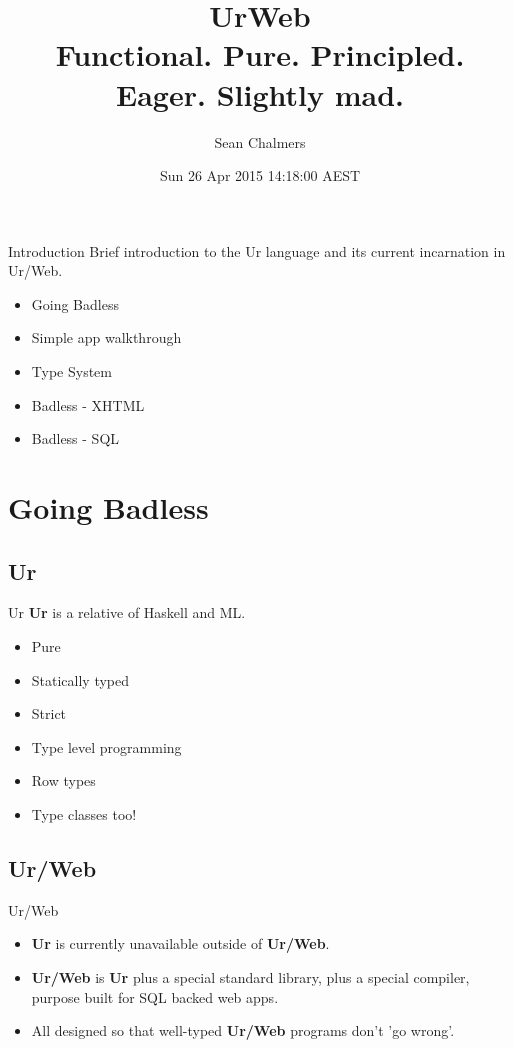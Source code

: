 \documentclass{beamer}
\title[Introduction to UrWeb]{UrWeb\\Functional. Pure. Principled. Eager. Slightly mad.}
\author{Sean Chalmers}
\date{Sun 26 Apr 2015 14:18:00 AEST}
\begin{document}
\begin{frame}
\titlepage
\end{frame}


\begin{frame}{Introduction}
Brief introduction to the Ur language and its current incarnation in Ur/Web.

\begin{itemize}
\item Going Badless
\item Simple app walkthrough
\item Type System
\item Badless - XHTML
\item Badless - SQL
\end{itemize}
\end{frame}

\section{Going Badless}
\subsection{Ur}

\begin{frame}{Ur}
\textbf{Ur} is a relative of Haskell and ML.

\begin{itemize}
\item Pure
\item Statically typed
\item Strict
\item Type level programming
\item Row types
\item Type classes too!
\end{itemize}
\end{frame}

\subsection{Ur/Web}
\begin{frame}{Ur/Web}

\begin{itemize}
\item \textbf{Ur} is currently unavailable outside of \textbf{Ur/Web}.
\vspace{\baselineskip}
\item \textbf{Ur/Web} is \textbf{Ur} plus a special standard library,
 plus a special compiler, purpose built for SQL backed web apps.
\vspace{\baselineskip}
\item All designed so that well-typed \textbf{Ur/Web} programs don't 'go wrong'.
\end{itemize}
\end{frame}
\end{document}
